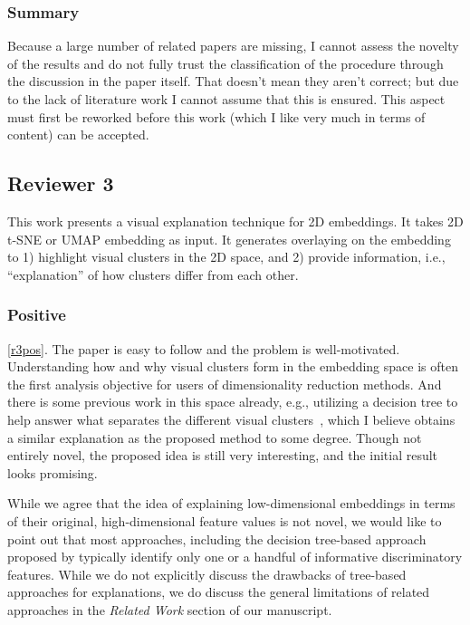 \documentclass{article}
\newcounter{rtaskno}
\newcommand{\rtask}[1]{\refstepcounter{rtaskno}\label{#1}}
\newcommand{\reviewc}[2]{\begin{leftbar}\noindent\rtask{#1}\ref{#1}. #2\end{leftbar}}
\newcommand{\review}[1]{\begin{leftbar}\noindent #1\end{leftbar}}
\newcommand{\answer}[1]{\noindent #1\\[0mm]}
\newlength{\leftbarwidth}
\newlength{\leftbarsep}
\renewenvironment{leftbar}{%
    \def\FrameCommand{{\color{black}{\vrule width \leftbarwidth\relax\hspace {\leftbarsep}}}}%
    \MakeFramed {\advance \hsize -\width \FrameRestore }%
}{\endMakeFramed}
\begin{document}
\subsubsection*{Summary}

\review{Because a large number of related papers are missing, I cannot assess the novelty of the results and do not fully trust the classification of the procedure through the discussion in the paper itself. That doesn't mean they aren't correct; but due to the lack of literature work I cannot assume that this is ensured. This aspect must first be reworked before this work (which I like very much in terms of content) can be accepted.}


\subsection*{Reviewer 3}

\review{This work presents a visual explanation technique for 2D embeddings. It takes 2D t-SNE or UMAP embedding as input. It generates overlaying on the embedding to 1) highlight visual clusters in the 2D space, and 2) provide information, i.e., “explanation” of how clusters differ from each other.}

\subsubsection*{Positive}

\reviewc{r3pos}{The paper is easy to follow and the problem is well-motivated. Understanding how and why visual clusters form in the embedding space is often the first analysis objective for users of dimensionality reduction methods. And there is some previous work in this space already, e.g., utilizing a decision tree to help answer what separates the different visual clusters~\citep{Bibal2021}, which I believe obtains a similar explanation as the proposed method to some degree. Though not entirely novel, the proposed idea is still very interesting, and the initial result looks promising.}

\answer{While we agree that the idea of explaining low-dimensional embeddings in terms of their original, high-dimensional feature values is not novel, we would like to point out that most approaches, including the decision tree-based approach proposed by \citet{Bibal2021} typically identify only one or a handful of informative discriminatory features. While we do not explicitly discuss the drawbacks of tree-based approaches for explanations, we do discuss the general limitations of related approaches in the \textit{Related Work} section of our manuscript.}
\end{document}
